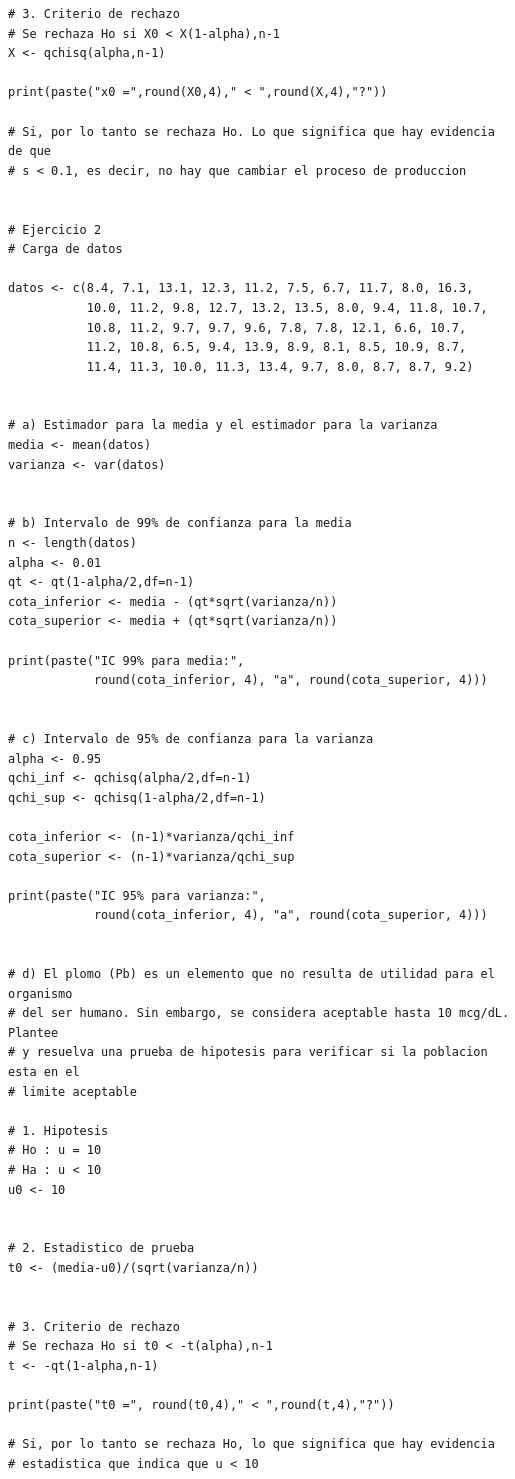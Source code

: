 \documentclass[12pt,a4paper]{article}
\begin{document}
\begin{lstlisting}
# 3. Criterio de rechazo
# Se rechaza Ho si X0 < X(1-alpha),n-1
X <- qchisq(alpha,n-1)

print(paste("x0 =",round(X0,4)," < ",round(X,4),"?"))

# Si, por lo tanto se rechaza Ho. Lo que significa que hay evidencia de que
# s < 0.1, es decir, no hay que cambiar el proceso de produccion


# Ejercicio 2
# Carga de datos

datos <- c(8.4, 7.1, 13.1, 12.3, 11.2, 7.5, 6.7, 11.7, 8.0, 16.3, 
           10.0, 11.2, 9.8, 12.7, 13.2, 13.5, 8.0, 9.4, 11.8, 10.7, 
           10.8, 11.2, 9.7, 9.7, 9.6, 7.8, 7.8, 12.1, 6.6, 10.7, 
           11.2, 10.8, 6.5, 9.4, 13.9, 8.9, 8.1, 8.5, 10.9, 8.7, 
           11.4, 11.3, 10.0, 11.3, 13.4, 9.7, 8.0, 8.7, 8.7, 9.2)


# a) Estimador para la media y el estimador para la varianza
media <- mean(datos)
varianza <- var(datos)


# b) Intervalo de 99% de confianza para la media
n <- length(datos)
alpha <- 0.01
qt <- qt(1-alpha/2,df=n-1)
cota_inferior <- media - (qt*sqrt(varianza/n))
cota_superior <- media + (qt*sqrt(varianza/n))

print(paste("IC 99% para media:", 
            round(cota_inferior, 4), "a", round(cota_superior, 4)))


# c) Intervalo de 95% de confianza para la varianza
alpha <- 0.95
qchi_inf <- qchisq(alpha/2,df=n-1)
qchi_sup <- qchisq(1-alpha/2,df=n-1)

cota_inferior <- (n-1)*varianza/qchi_inf
cota_superior <- (n-1)*varianza/qchi_sup

print(paste("IC 95% para varianza:", 
            round(cota_inferior, 4), "a", round(cota_superior, 4)))


# d) El plomo (Pb) es un elemento que no resulta de utilidad para el organismo
# del ser humano. Sin embargo, se considera aceptable hasta 10 mcg/dL. Plantee
# y resuelva una prueba de hipotesis para verificar si la poblacion esta en el
# limite aceptable

# 1. Hipotesis
# Ho : u = 10
# Ha : u < 10
u0 <- 10


# 2. Estadistico de prueba
t0 <- (media-u0)/(sqrt(varianza/n))


# 3. Criterio de rechazo
# Se rechaza Ho si t0 < -t(alpha),n-1
t <- -qt(1-alpha,n-1)

print(paste("t0 =", round(t0,4)," < ",round(t,4),"?"))

# Si, por lo tanto se rechaza Ho, lo que significa que hay evidencia
# estadistica que indica que u < 10


\end{lstlisting}
\end{document}
